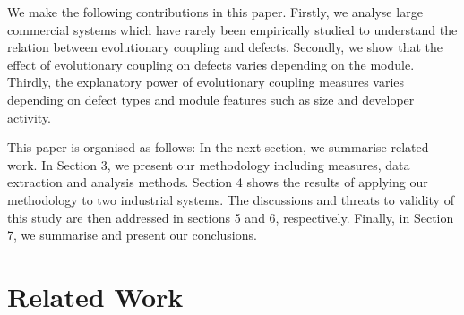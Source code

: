 \documentclass[times]{smrauth}
\begin{document}
We make the following contributions in this paper. Firstly, we analyse large commercial systems which have rarely been empirically studied to understand the relation between evolutionary coupling and defects. Secondly, we show that the effect of evolutionary coupling on defects varies depending on the module. Thirdly, the explanatory power of evolutionary coupling measures varies depending on defect types and module features such as size and developer activity.

This paper is organised as follows: In the next section, we summarise related work. In Section 3, we present our methodology including measures, data extraction and analysis methods. Section 4 shows the results of applying our methodology to two industrial systems. The discussions and threats to validity of this study are then addressed in sections 5 and 6, respectively. Finally, in Section 7, we summarise and present our conclusions.

%
%
%

\section{Related Work}

\end{document}
